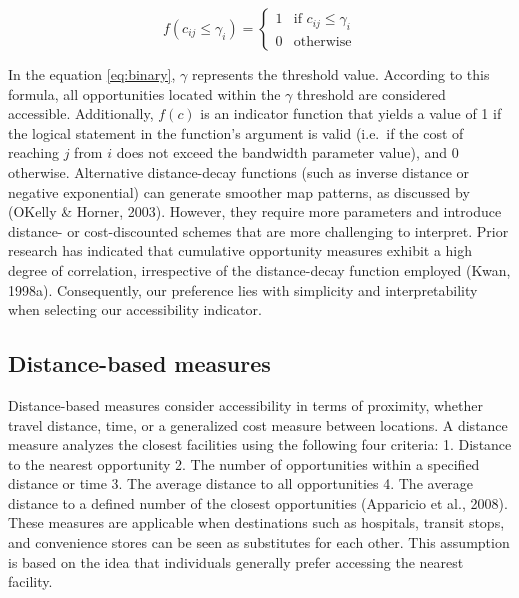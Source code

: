 \documentclass[
11pt, %
oneside, %
english, %
singlespacing, %
]{macthesis} %
\begin{document}
\begin{equation}
f(c_{ij} \le \gamma _i) = 
\begin{cases}
  1 & \text{if } c_{ij} \le \gamma _i \\
  0 & \text{otherwise}
\end{cases}
\label{eq:binary}
\end{equation}

In the equation \eqref{eq:binary}, \(\gamma\) represents the threshold value. According to this formula, all opportunities located within the \(\gamma\) threshold are considered accessible. Additionally, \(f(c)\) is an indicator function that yields a value of 1 if the logical statement in the function's argument is valid (i.e.~if the cost of reaching \(j\) from \(i\) does not exceed the bandwidth parameter value), and 0 otherwise. Alternative distance-decay functions (such as inverse distance or negative exponential) can generate smoother map patterns, as discussed by (OKelly \& Horner, 2003). However, they require more parameters and introduce distance- or cost-discounted schemes that are more challenging to interpret. Prior research has indicated that cumulative opportunity measures exhibit a high degree of correlation, irrespective of the distance-decay function employed (Kwan, 1998a). Consequently, our preference lies with simplicity and interpretability when selecting our accessibility indicator.

\hypertarget{distance-based-measures}{%
\subsection{Distance-based measures}\label{distance-based-measures}}

Distance-based measures consider accessibility in terms of proximity, whether travel distance, time, or a generalized cost measure between locations. A distance measure analyzes the closest facilities using the following four criteria:
1. Distance to the nearest opportunity
2. The number of opportunities within a specified distance or time
3. The average distance to all opportunities
4. The average distance to a defined number of the closest opportunities (Apparicio et al., 2008). These measures are applicable when destinations such as hospitals, transit stops, and convenience stores can be seen as substitutes for each other. This assumption is based on the idea that individuals generally prefer accessing the nearest facility.
\end{document}
